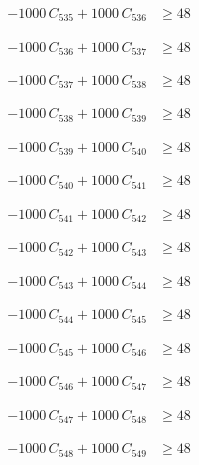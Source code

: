 \documentclass[a4paper,11pt]{article}
\begin{document}
\begin{align}
-1000\,C_{535} + 1000\,C_{536} &\geq 48 \nonumber
\end{align}

\begin{align}
-1000\,C_{536} + 1000\,C_{537} &\geq 48 \nonumber
\end{align}

\begin{align}
-1000\,C_{537} + 1000\,C_{538} &\geq 48 \nonumber
\end{align}

\begin{align}
-1000\,C_{538} + 1000\,C_{539} &\geq 48 \nonumber
\end{align}

\begin{align}
-1000\,C_{539} + 1000\,C_{540} &\geq 48 \nonumber
\end{align}

\begin{align}
-1000\,C_{540} + 1000\,C_{541} &\geq 48 \nonumber
\end{align}

\begin{align}
-1000\,C_{541} + 1000\,C_{542} &\geq 48 \nonumber
\end{align}

\begin{align}
-1000\,C_{542} + 1000\,C_{543} &\geq 48 \nonumber
\end{align}

\begin{align}
-1000\,C_{543} + 1000\,C_{544} &\geq 48 \nonumber
\end{align}

\begin{align}
-1000\,C_{544} + 1000\,C_{545} &\geq 48 \nonumber
\end{align}

\begin{align}
-1000\,C_{545} + 1000\,C_{546} &\geq 48 \nonumber
\end{align}

\begin{align}
-1000\,C_{546} + 1000\,C_{547} &\geq 48 \nonumber
\end{align}

\begin{align}
-1000\,C_{547} + 1000\,C_{548} &\geq 48 \nonumber
\end{align}

\begin{align}
-1000\,C_{548} + 1000\,C_{549} &\geq 48 \nonumber
\end{align}
\end{document}
